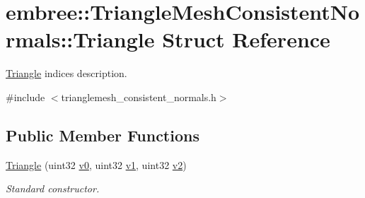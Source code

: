 \hypertarget{structembree_1_1_triangle_mesh_consistent_normals_1_1_triangle}{
\section{embree::TriangleMeshConsistentNormals::Triangle Struct Reference}
\label{structembree_1_1_triangle_mesh_consistent_normals_1_1_triangle}
}


\hyperlink{structembree_1_1_triangle_mesh_consistent_normals_1_1_triangle}{Triangle} indices description.  




{\ttfamily \#include $<$trianglemesh\_\-consistent\_\-normals.h$>$}

\subsection*{Public Member Functions}
\begin{DoxyCompactItemize}
\item 
\hypertarget{structembree_1_1_triangle_mesh_consistent_normals_1_1_triangle_ad12bd0f1c64be651d3bfc19828c9bcb9}{
\hyperlink{structembree_1_1_triangle_mesh_consistent_normals_1_1_triangle_ad12bd0f1c64be651d3bfc19828c9bcb9}{Triangle} (uint32 \hyperlink{structembree_1_1_triangle_mesh_consistent_normals_1_1_triangle_adf7f8ea4a34faad6d14507bd53ac2090}{v0}, uint32 \hyperlink{structembree_1_1_triangle_mesh_consistent_normals_1_1_triangle_a65c34fcedc3284a963ee59a3084e2f9c}{v1}, uint32 \hyperlink{structembree_1_1_triangle_mesh_consistent_normals_1_1_triangle_ad13ef398454e34b5a3a2cfbd84640657}{v2})}
\label{structembree_1_1_triangle_mesh_consistent_normals_1_1_triangle_ad12bd0f1c64be651d3bfc19828c9bcb9}

\begin{DoxyCompactList}\small\item\em Standard constructor. \item\end{DoxyCompactList}\end{DoxyCompactItemize}
